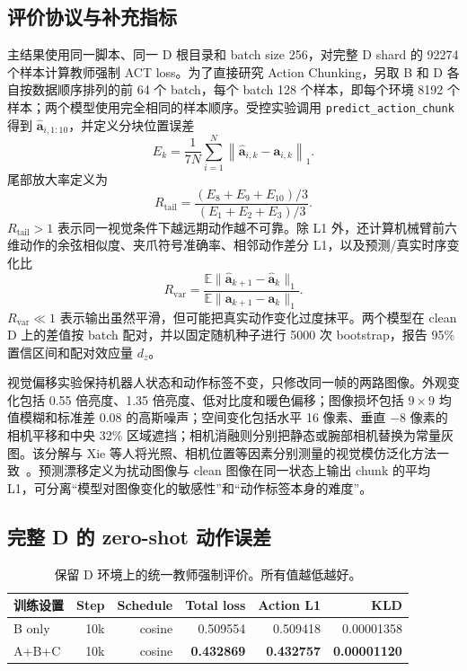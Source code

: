 \documentclass[letterpaper,times,10pt,twocolumn]{article}
\begin{document}
\subsection{评价协议与补充指标}

主结果使用同一脚本、同一 D 根目录和 batch size 256，对完整 D shard 的 92274 个样本计算教师强制 ACT loss。为了直接研究 Action Chunking，另取 B 和 D 各自按数据顺序排列的前 64 个 batch，每个 batch 128 个样本，即每个环境 8192 个样本；两个模型使用完全相同的样本顺序。受控实验调用 \texttt{predict\_action\_chunk} 得到 $\hat{\mathbf a}_{i,1:10}$，并定义分块位置误差
\[
E_k=\frac{1}{7N}\sum_{i=1}^{N}\left\lVert
\hat{\mathbf a}_{i,k}-\mathbf a_{i,k}\right\rVert_1 .
\]
尾部放大率定义为
\[
R_{\mathrm{tail}}=\frac{(E_8+E_9+E_{10})/3}{(E_1+E_2+E_3)/3}.
\]
$R_{\mathrm{tail}}>1$ 表示同一视觉条件下越远期动作越不可靠。除 L1 外，还计算机械臂前六维动作的余弦相似度、夹爪符号准确率、相邻动作差分 L1，以及预测/真实时序变化比
\[
R_{\mathrm{var}}=
\frac{\mathbb{E}\lVert\hat{\mathbf a}_{k+1}-\hat{\mathbf a}_{k}\rVert_1}
{\mathbb{E}\lVert\mathbf a_{k+1}-\mathbf a_{k}\rVert_1}.
\]
$R_{\mathrm{var}}\ll1$ 表示输出虽然平滑，但可能把真实动作变化过度抹平。两个模型在 clean D 上的差值按 batch 配对，并以固定随机种子进行 5000 次 bootstrap，报告 95\% 置信区间和配对效应量 $d_z$。

视觉偏移实验保持机器人状态和动作标签不变，只修改同一帧的两路图像。外观变化包括 0.55 倍亮度、1.35 倍亮度、低对比度和暖色偏移；图像损坏包括 $9\times9$ 均值模糊和标准差 0.08 的高斯噪声；空间变化包括水平 16 像素、垂直 $-8$ 像素的相机平移和中央 32\% 区域遮挡；相机消融则分别把静态或腕部相机替换为常量灰图。该分解与 Xie 等人将光照、相机位置等因素分别测量的视觉模仿泛化方法一致~\cite{xie2023generalization}。预测漂移定义为扰动图像与 clean 图像在同一状态上输出 chunk 的平均 L1，可分离“模型对图像变化的敏感性”和“动作标签本身的难度”。

\subsection{完整 D 的 zero-shot 动作误差}

\begin{table}[t]
\centering
\caption{保留 D 环境上的统一教师强制评价。所有值越低越好。}
\label{tab:offline}
\small
\begin{tabular}{lrrrrr}
\toprule
训练设置 & Step & Schedule & Total loss & Action L1 & KLD \\
\midrule
B only & 10k & cosine & 0.509554 & 0.509418 & 0.00001358 \\
\rowcolor{bestrow}
A+B+C & 10k & cosine & \textbf{0.432869} & \textbf{0.432757} & \textbf{0.00001120} \\
\bottomrule
\end{tabular}
\end{table}
\end{document}
